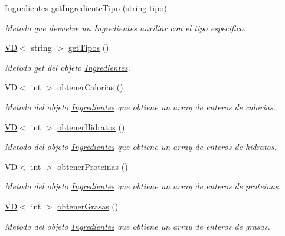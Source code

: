 \begin{DoxyCompactItemize}
\hyperlink{classIngredientes}{Ingredientes} \hyperlink{classIngredientes_a513a2a7af0995e893b288ca4cb4c49ef}{get\+Ingrediente\+Tipo} (string tipo)
\begin{DoxyCompactList}\small\item\em Metodo que devuelve un \hyperlink{classIngredientes}{Ingredientes} auxiliar con el tipo especifico. \end{DoxyCompactList}\item 
\hyperlink{classVD}{VD}$<$ string $>$ \hyperlink{classIngredientes_a22513179fac0e797e685363677dcbaed}{get\+Tipos} ()
\begin{DoxyCompactList}\small\item\em Metodo get del objeto \hyperlink{classIngredientes}{Ingredientes}. \end{DoxyCompactList}\item 
\hyperlink{classVD}{VD}$<$ int $>$ \hyperlink{classIngredientes_a200af458def970ff66a49f61f9489bef}{obtener\+Calorias} ()
\begin{DoxyCompactList}\small\item\em Metodo del objeto \hyperlink{classIngredientes}{Ingredientes} que obtiene un array de enteros de calorias. \end{DoxyCompactList}\item 
\hyperlink{classVD}{VD}$<$ int $>$ \hyperlink{classIngredientes_a5ee2f129cb9b8e10233c8825434d02f8}{obtener\+Hidratos} ()
\begin{DoxyCompactList}\small\item\em Metodo del objeto \hyperlink{classIngredientes}{Ingredientes} que obtiene un array de enteros de hidratos. \end{DoxyCompactList}\item 
\hyperlink{classVD}{VD}$<$ int $>$ \hyperlink{classIngredientes_a0fc7e034c76a34734fa058176787b18f}{obtener\+Proteinas} ()
\begin{DoxyCompactList}\small\item\em Metodo del objeto \hyperlink{classIngredientes}{Ingredientes} que obtiene un array de enteros de proteinas. \end{DoxyCompactList}\item 
\hyperlink{classVD}{VD}$<$ int $>$ \hyperlink{classIngredientes_a4a2711aa37d3653634d5a54e3f59fef8}{obtener\+Grasas} ()
\begin{DoxyCompactList}\small\item\em Metodo del objeto \hyperlink{classIngredientes}{Ingredientes} que obtiene un array de enteros de grasas. \end{DoxyCompactList}\item 

\end{DoxyCompactItemize}
